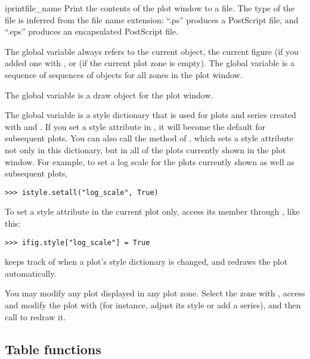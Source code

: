 \begin{funcdesc}{iprint}{file_name}
 Print the contents of the plot window to a file.  The type of the file
 is inferred from the file name extension: ``.ps'' produces a PostScript
 file, and ``.eps'' produces an encapsulated PostScript file.
\end{funcdesc}

The global variable  always refers to the current 
object, the current figure (if you added one with , or
 (if the current plot zone is empty).  The global variable
 is a sequence of sequences of  objects for all
zones in the plot window.

The global variable  is a draw object for the plot window.

The global variable  is a style dictionary that is used for
plots and series created with  and .
If you set a style attribute in , it will become the
default for subsequent plots.  You can also call the 
method of , which sets a style attribute not only in this
dictionary, but in all of the plots currently shown in the plot window. 
For example, to set a log scale for the plots currently shown as well as
subsequent plots,
\begin{verbatim}
>>> istyle.setall("log_scale", True)
\end{verbatim}
To set a style attribute in the current plot only, access its
 member through , like this:
\begin{verbatim}
>>> ifig.style["log_scale"] = True
\end{verbatim}
\pyhep keeps track of when a plot's style dictionary is changed, and
redraws the plot automatically.

You may modify any plot displayed in any plot zone.  Select the zone
with , access and modify the plot with 
(for instance, adjust its style or add a series), and then call
 to redraw it.

\subsection{Table functions}

